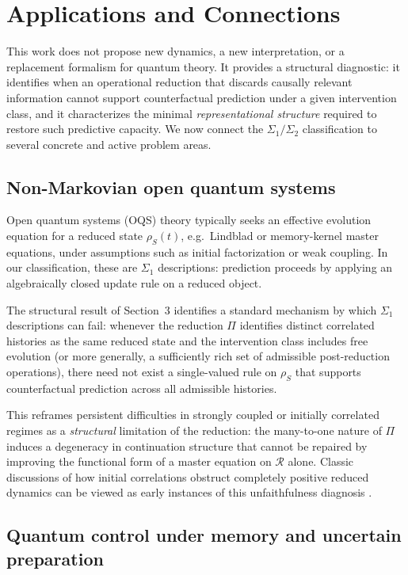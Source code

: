 \section{Applications and Connections}
\label{sec:applications}

This work does not propose new dynamics, a new interpretation, or a replacement formalism for
quantum theory. It provides a structural diagnostic: it identifies when an operational reduction
that discards causally relevant information cannot support counterfactual prediction under a
given intervention class, and it characterizes the minimal \emph{representational structure}
required to restore such predictive capacity. We now connect the $\Sigma_1/\Sigma_2$
classification to several concrete and active problem areas.

\subsection{Non-Markovian open quantum systems}
\label{sec:oqs}

Open quantum systems (OQS) theory typically seeks an effective evolution equation for a reduced
state $\rho_S(t)$, e.g.\ Lindblad or memory-kernel master equations, under assumptions such as
initial factorization or weak coupling. In our classification, these are $\Sigma_1$ descriptions:
prediction proceeds by applying an algebraically closed update rule on a reduced object.

The structural result of Section~3 identifies a standard mechanism by which $\Sigma_1$
descriptions can fail: whenever the reduction $\Pi$ identifies distinct correlated histories
as the same reduced state and the intervention class includes free evolution (or more generally,
a sufficiently rich set of admissible post-reduction operations), there need not exist a
single-valued rule on $\rho_S$ that supports counterfactual prediction across all admissible
histories.

This reframes persistent difficulties in strongly coupled or initially correlated regimes as a
\emph{structural} limitation of the reduction: the many-to-one nature of $\Pi$ induces a
degeneracy in continuation structure that cannot be repaired by improving the functional form
of a master equation on $\mathcal{R}$ alone. Classic discussions of how initial correlations
obstruct completely positive reduced dynamics can be viewed as early instances of this
unfaithfulness diagnosis \cite{Pechukas1994,Alicki1995}.

\subsection{Quantum control under memory and uncertain preparation}
\label{sec:control}

